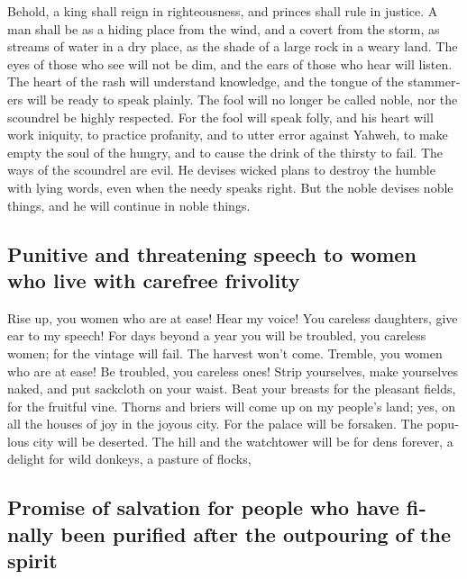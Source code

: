 \begin{paracol}{2}
\begin{otherlanguage}{english}
 Behold, a king shall reign in righteousness, and princes
shall rule in justice.  A man shall be as a hiding place
from the wind, and a covert from the storm, as streams of water in a dry
place, as the shade of a large rock in a weary land.  The
eyes of those who see will not be dim, and the ears of those who hear
will listen.  The heart of the rash will understand
knowledge, and the tongue of the stammerers will be ready to speak
plainly.  The fool will no longer be called noble, nor the
scoundrel be highly respected.  For the fool will speak
folly, and his heart will work iniquity, to practice profanity, and to
utter error against Yahweh, to make empty the soul of the hungry, and to
cause the drink of the thirsty to fail.  The ways of the
scoundrel are evil. He devises wicked plans to destroy the humble with
lying words, even when the needy speaks right.  But the
noble devises noble things, and he will continue in noble things.

\hypertarget{punitive-and-threatening-speech-to-women-who-live-with-carefree-frivolity}{%
\subsection{Punitive and threatening speech to women who live with
carefree
frivolity}\label{punitive-and-threatening-speech-to-women-who-live-with-carefree-frivolity}}

 Rise up, you women who are at ease! Hear my voice! You
careless daughters, give ear to my speech!  For days
beyond a year you will be troubled, you careless women; for the vintage
will fail. The harvest won't come.  Tremble, you women
who are at ease! Be troubled, you careless ones! Strip yourselves, make
yourselves naked, and put sackcloth on your waist.  Beat
your breasts for the pleasant fields, for the fruitful vine.
 Thorns and briers will come up on my people's land; yes,
on all the houses of joy in the joyous city.  For the
palace will be forsaken. The populous city will be deserted. The hill
and the watchtower will be for dens forever, a delight for wild donkeys,
a pasture of flocks,

\hypertarget{promise-of-salvation-for-people-who-have-finally-been-purified-after-the-outpouring-of-the-spirit}{%
\subsection{Promise of salvation for people who have finally been
purified after the outpouring of the
spirit}\label{promise-of-salvation-for-people-who-have-finally-been-purified-after-the-outpouring-of-the-spirit}}


\end{otherlanguage}
\end{paracol}
